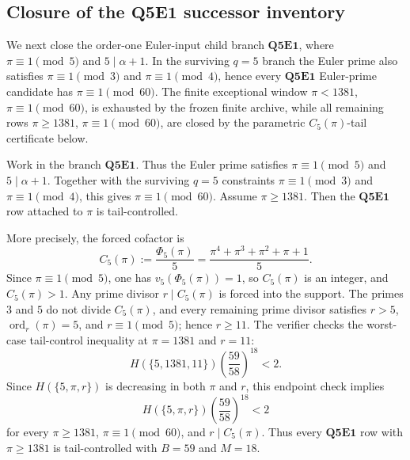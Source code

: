 \subsection{Closure of the \texorpdfstring{\(\mathbf{Q5E1}\)}{Q5E1} successor inventory}
\label{subsec:q5e1-successor-inventory-closure}

We next close the order-one Euler-input child branch
\(\mathbf{Q5E1}\), where \(\pi\equiv1\pmod5\) and \(5\mid\alpha+1\).  In the
surviving \(q=5\) branch the Euler prime also satisfies
\(\pi\equiv1\pmod3\) and \(\pi\equiv1\pmod4\), hence every
\(\mathbf{Q5E1}\) Euler-prime candidate has \(\pi\equiv1\pmod{60}\).  The
finite exceptional window \(\pi<1381\), \(\pi\equiv1\pmod{60}\), is exhausted
by the frozen finite archive, while all remaining rows
\(\pi\ge1381\), \(\pi\equiv1\pmod{60}\), are closed by the parametric
\(C_5(\pi)\)-tail certificate below.



\begin{criterion}
\label{crit:q5e1-parametric-pi-window-closure}
Work in the branch \(\mathbf{Q5E1}\).  Thus the Euler prime satisfies
\(\pi\equiv1\pmod5\) and \(5\mid\alpha+1\).  Together with the surviving
\(q=5\) constraints \(\pi\equiv1\pmod3\) and \(\pi\equiv1\pmod4\), this gives
\(\pi\equiv1\pmod{60}\).  Assume \(\pi\ge1381\).  Then the
\(\mathbf{Q5E1}\) row attached to \(\pi\) is tail-controlled.

More precisely, the forced cofactor is
\[
  C_5(\pi)
  :=
  \frac{\Phi_5(\pi)}5
  =
  \frac{\pi^4+\pi^3+\pi^2+\pi+1}{5}.
\]
Since
\(\pi\equiv1\pmod5\), one has \(v_5(\Phi_5(\pi))=1\), so \(C_5(\pi)\) is an
integer, and \(C_5(\pi)>1\).  Any prime divisor \(r\mid C_5(\pi)\) is forced
into the support.  The primes \(3\) and \(5\) do not divide
\(C_5(\pi)\), and every remaining prime divisor satisfies
\(r>5\), \(\operatorname{ord}_r(\pi)=5\), and \(r\equiv1\pmod5\); hence
\(r\ge11\).  The verifier checks the worst-case tail-control inequality at
\(\pi=1381\) and \(r=11\):
\[
  H(\{5,1381,11\})
  \left(\frac{59}{58}\right)^{18}
  <2.
\]
Since \(H(\{5,\pi,r\})\) is decreasing in both \(\pi\) and \(r\), this endpoint
check implies
\[
  H(\{5,\pi,r\})
  \left(\frac{59}{58}\right)^{18}
  <2
\]
for every \(\pi\ge1381\), \(\pi\equiv1\pmod{60}\), and
\(r\mid C_5(\pi)\).  Thus every \(\mathbf{Q5E1}\) row with \(\pi\ge1381\) is
tail-controlled with \(B=59\) and \(M=18\).
\end{criterion}

